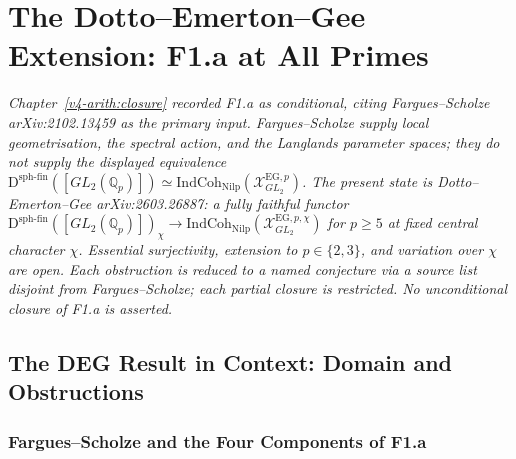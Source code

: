 \chapter{The Dotto--Emerton--Gee Extension: F1.a at All Primes}
\label{v4-arith:deg-f1a}

\emph{Chapter~\ref{v4-arith:closure} recorded F1.a as conditional,
citing Fargues--Scholze arXiv:2102.13459 as the primary input.
Fargues--Scholze supply local geometrisation, the spectral action,
and the Langlands parameter spaces; they do not supply the displayed
equivalence
\(\mathrm{D}^{\mathrm{sph\text{-}fin}}([GL_{2}(\mathbb{Q}_{p})])\simeq\mathrm{IndCoh}_{\mathrm{Nilp}}(\mathcal{X}^{\mathrm{EG},p}_{GL_{2}})\).
The present state is Dotto--Emerton--Gee arXiv:2603.26887: a fully
faithful functor
\(\mathrm{D}^{\mathrm{sph\text{-}fin}}([GL_{2}(\mathbb{Q}_{p})])_{\chi}\to\mathrm{IndCoh}_{\mathrm{Nilp}}(\mathcal{X}^{\mathrm{EG},p,\chi}_{GL_{2}})\)
for \(p\geq 5\) at fixed central character \(\chi\). Essential
surjectivity, extension to \(p\in\{2,3\}\), and variation over \(\chi\)
are open. Each obstruction is reduced to a named conjecture via a
source list disjoint from Fargues--Scholze; each partial closure
is restricted. No unconditional closure of F1.a is asserted.}

\section{The DEG Result in Context: Domain and Obstructions}
\label{v4-arith:deg-f1a:context}

\subsection{Fargues--Scholze and the Four Components of F1.a}

